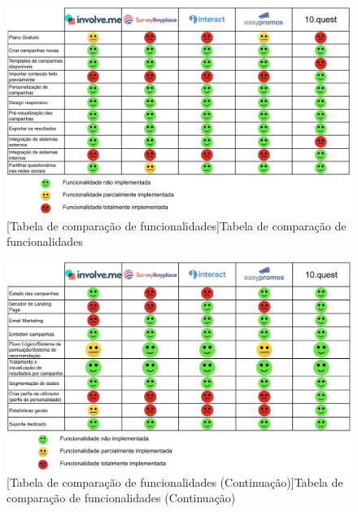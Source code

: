 \begin{figure}[ht!]
	\begin{center}
		\includegraphics[width=1\textwidth]{img/ea/ea1}
		[Tabela de comparação de funcionalidades]{Tabela de comparação de funcionalidades}
		\label{fig:ea-1}
	\end{center}
\end{figure}

\begin{figure}[ht!]
	\begin{center}
		\includegraphics[width=1\textwidth]{img/ea/ea2}
		[Tabela de comparação de funcionalidades (Continuação)]{Tabela de comparação de funcionalidades (Continuação)}
		\label{fig:ea-2}
	\end{center}
\end{figure}



